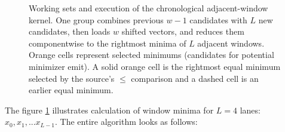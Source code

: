 \begin{figure}[H]
  \caption{Working sets and execution of the chronological adjacent-window
  kernel.  One group combines previous $w-1$ candidates with $L$ new
  candidates, then loads $w$ shifted vectors, and reduces them componentwise to the
  rightmost minima of $L$ adjacent windows. Orange cells represent selected minimums (candidates for potential minimizer emit).
  A solid orange cell is the rightmost equal minimum selected by the source's $\leq$ comparison and a dashed cell is an earlier equal
  minimum.}
  \label{fig:rewrite-chronological-groups}
  \end{figure}
  
The figure \ref{fig:rewrite-chronological-groups} illustrates calculation of window minima for $L=4$ lanes: $x_0, x_1, ... x_{L-1}$. The entire algorithm looks as follows:

